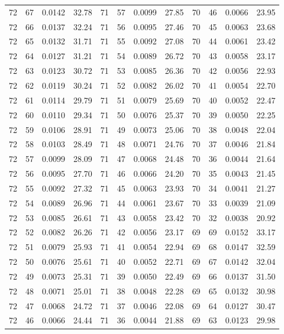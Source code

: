 \begin{tabular}{llll|llll|llll}
72 & 67 & 0.0142 & 32.78 & 71 & 57 & 0.0099 & 27.85 & 70 & 46 & 0.0066 & 23.95\\
72 & 66 & 0.0137 & 32.24 & 71 & 56 & 0.0095 & 27.46 & 70 & 45 & 0.0063 & 23.68\\
72 & 65 & 0.0132 & 31.71 & 71 & 55 & 0.0092 & 27.08 & 70 & 44 & 0.0061 & 23.42\\
72 & 64 & 0.0127 & 31.21 & 71 & 54 & 0.0089 & 26.72 & 70 & 43 & 0.0058 & 23.17\\
72 & 63 & 0.0123 & 30.72 & 71 & 53 & 0.0085 & 26.36 & 70 & 42 & 0.0056 & 22.93\\
72 & 62 & 0.0119 & 30.24 & 71 & 52 & 0.0082 & 26.02 & 70 & 41 & 0.0054 & 22.70\\
72 & 61 & 0.0114 & 29.79 & 71 & 51 & 0.0079 & 25.69 & 70 & 40 & 0.0052 & 22.47\\
72 & 60 & 0.0110 & 29.34 & 71 & 50 & 0.0076 & 25.37 & 70 & 39 & 0.0050 & 22.25\\
72 & 59 & 0.0106 & 28.91 & 71 & 49 & 0.0073 & 25.06 & 70 & 38 & 0.0048 & 22.04\\
72 & 58 & 0.0103 & 28.49 & 71 & 48 & 0.0071 & 24.76 & 70 & 37 & 0.0046 & 21.84\\
72 & 57 & 0.0099 & 28.09 & 71 & 47 & 0.0068 & 24.48 & 70 & 36 & 0.0044 & 21.64\\
72 & 56 & 0.0095 & 27.70 & 71 & 46 & 0.0066 & 24.20 & 70 & 35 & 0.0043 & 21.45\\
72 & 55 & 0.0092 & 27.32 & 71 & 45 & 0.0063 & 23.93 & 70 & 34 & 0.0041 & 21.27\\
72 & 54 & 0.0089 & 26.96 & 71 & 44 & 0.0061 & 23.67 & 70 & 33 & 0.0039 & 21.09\\
72 & 53 & 0.0085 & 26.61 & 71 & 43 & 0.0058 & 23.42 & 70 & 32 & 0.0038 & 20.92\\
72 & 52 & 0.0082 & 26.26 & 71 & 42 & 0.0056 & 23.17 & 69 & 69 & 0.0152 & 33.17\\
72 & 51 & 0.0079 & 25.93 & 71 & 41 & 0.0054 & 22.94 & 69 & 68 & 0.0147 & 32.59\\
72 & 50 & 0.0076 & 25.61 & 71 & 40 & 0.0052 & 22.71 & 69 & 67 & 0.0142 & 32.04\\
72 & 49 & 0.0073 & 25.31 & 71 & 39 & 0.0050 & 22.49 & 69 & 66 & 0.0137 & 31.50\\
72 & 48 & 0.0071 & 25.01 & 71 & 38 & 0.0048 & 22.28 & 69 & 65 & 0.0132 & 30.98\\
72 & 47 & 0.0068 & 24.72 & 71 & 37 & 0.0046 & 22.08 & 69 & 64 & 0.0127 & 30.47\\
72 & 46 & 0.0066 & 24.44 & 71 & 36 & 0.0044 & 21.88 & 69 & 63 & 0.0123 & 29.98\\

\end{tabular}
